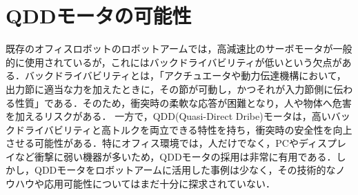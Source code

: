 
\section{QDDモータの可能性}
既存のオフィスロボットのロボットアームでは，高減速比のサーボモータが一般的に使用されているが，これにはバックドライバビリティが低いという欠点がある．バックドライバビリティとは，「アクチュエータや動力伝達機構において，出力節に適当な力を加えたときに，その節が可動し，かつそれが入力節側に伝わる性質」である\cite{backdrive:online}．そのため，衝突時の柔軟な応答が困難となり，人や物体へ危害を加えるリスクがある．
一方で，QDD(Quasi-Direct Dribe)モータは，高いバックドライバビリティと高トルクを両立できる特性を持ち，衝突時の安全性を向上させる可能性がある．特にオフィス環境では，人だけでなく，PCやディスプレイなど衝撃に弱い機器が多いため，QDDモータの採用は非常に有用である．しかし，QDDモータをロボットアームに活用した事例は少なく，その技術的なノウハウや応用可能性についてはまだ十分に探求されていない．
